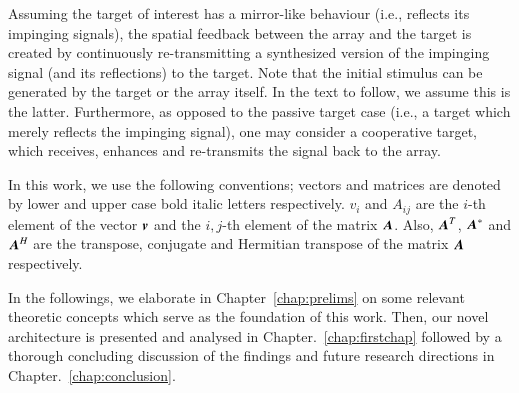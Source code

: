 Assuming the target of interest has a mirror-like behaviour (i.e., reflects its impinging signals), the spatial feedback between the array and the target is created by continuously re-transmitting a synthesized version of the impinging signal (and its reflections) to the target.
Note that the initial stimulus can be generated by the target or the array itself. In the text to follow, we assume this is the latter. 
Furthermore, as opposed to the passive target case (i.e., a target which merely reflects the impinging signal), one may consider a cooperative target, which receives, enhances and re-transmits the signal back to the array.
\par In this work, we use the following conventions; vectors and matrices are denoted by lower and upper case bold italic letters respectively. 
$v_{i}$ and $A_{ij}$ are the $i$-th element of the vector $\boldsymbol{v}$ and the $i,j$-th element of the matrix $\boldsymbol{A}$.
Also, $\boldsymbol{A}^{T}$, $\boldsymbol{A}^{*}$ and $\boldsymbol{A}^{H}$ are the transpose, conjugate and Hermitian transpose of the matrix $\boldsymbol{A}$ respectively.
\par In the followings, we elaborate in Chapter~\ref{chap:prelims} on some relevant theoretic concepts which serve as the foundation of this work.
Then, our novel architecture is presented and analysed in Chapter.~\ref{chap:firstchap} followed by a thorough concluding discussion of the findings and future research directions in Chapter.~\ref{chap:conclusion}.